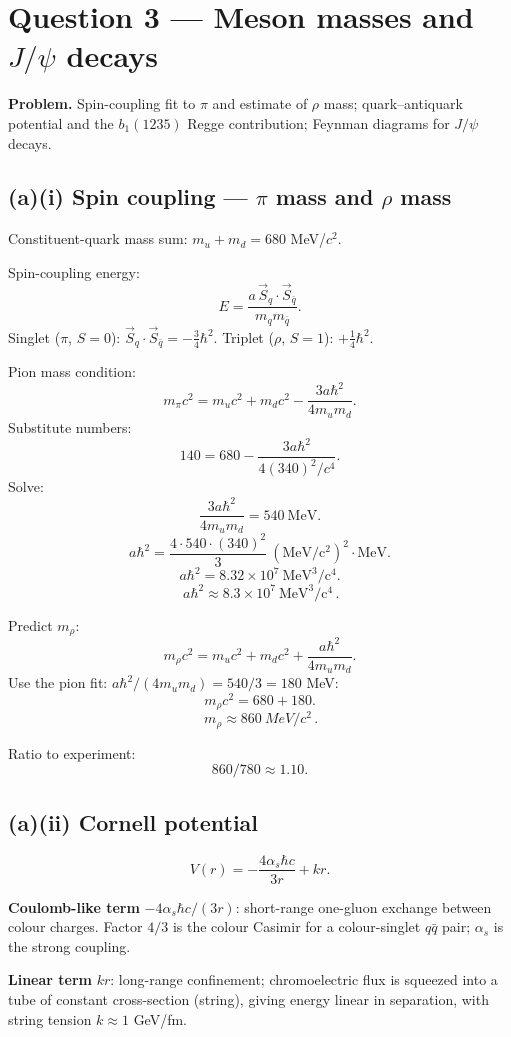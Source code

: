 \documentclass[11pt]{article}
\begin{document}
\section*{Question 3 --- Meson masses and $J/\psi$ decays}

\textbf{Problem.} Spin-coupling fit to $\pi$ and estimate of $\rho$ mass; quark--antiquark potential and the $b_1(1235)$ Regge contribution; Feynman diagrams for $J/\psi$ decays.

\subsection*{(a)(i) Spin coupling --- $\pi$ mass and $\rho$ mass}

Constituent-quark mass sum: $m_u+m_d = 680$ MeV/$c^2$.

Spin-coupling energy:
\[ E = \frac{a\,\vec S_q\cdot\vec S_{\bar q}}{m_q m_{\bar q}}. \]
Singlet ($\pi$, $S=0$): $\vec S_q\cdot\vec S_{\bar q} = -\tfrac{3}{4}\hbar^2$. Triplet ($\rho$, $S=1$): $+\tfrac{1}{4}\hbar^2$.

Pion mass condition:
\[ m_\pi c^2 = m_u c^2 + m_d c^2 - \frac{3a\hbar^2}{4 m_u m_d}. \]
Substitute numbers:
\[ 140 = 680 - \frac{3a\hbar^2}{4(340)^2/c^4}. \]
Solve:
\[ \frac{3a\hbar^2}{4 m_u m_d} = 540\ \mathrm{MeV}. \]
\[ a\hbar^2 = \frac{4\cdot 540\cdot (340)^2}{3}\ \mathrm{(MeV/c^2)^2\cdot MeV}. \]
\[ a\hbar^2 = 8.32\times 10^{7}\ \mathrm{MeV^3 / c^4}. \]
\[ \boxed{\,a\hbar^2 \approx 8.3\times 10^{7}\ \mathrm{MeV^3/c^4}\,}. \]

Predict $m_\rho$:
\[ m_\rho c^2 = m_u c^2 + m_d c^2 + \frac{a\hbar^2}{4 m_u m_d}. \]
Use the pion fit: $a\hbar^2/(4 m_u m_d) = 540/3 = 180$ MeV:
\[ m_\rho c^2 = 680 + 180. \]
\[ \boxed{\,m_\rho \approx \SI{860}{MeV/c^2}\,}. \]

Ratio to experiment:
\[ 860/780 \approx 1.10. \]

\subsection*{(a)(ii) Cornell potential}

\[ V(r) = -\frac{4\alpha_s\hbar c}{3r} + kr. \]

\textbf{Coulomb-like term} $-4\alpha_s\hbar c/(3r)$: short-range one-gluon exchange between colour charges. Factor $4/3$ is the colour Casimir for a colour-singlet $q\bar q$ pair; $\alpha_s$ is the strong coupling.

\textbf{Linear term} $kr$: long-range confinement; chromoelectric flux is squeezed into a tube of constant cross-section (string), giving energy linear in separation, with string tension $k\approx 1$ GeV/fm.
\end{document}

